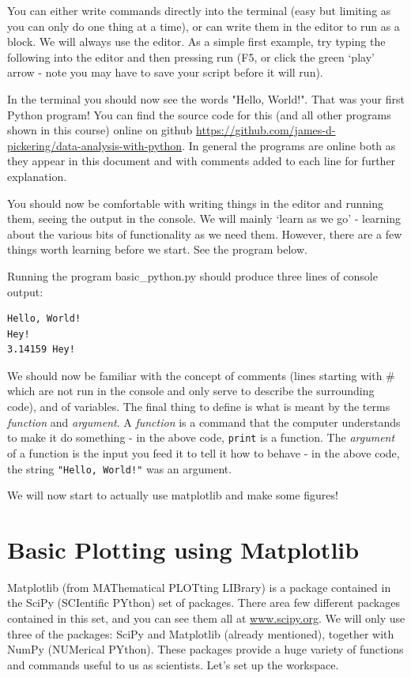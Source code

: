 \documentclass[10pt,a4paper]{memoir}
\begin{document}
You can either write commands directly into the terminal (easy but limiting as you can only do one thing at a time), or can write them in the editor to run as a block. We will always use the editor. As a simple first example, try typing the following into the editor and then pressing run (F5, or click the green `play' arrow - note you may have to save your script before it will run). 

In the terminal you should now see the words "Hello, World!". That was your first Python program! You can find the source code for this (and all other programs shown in this course) online on github \url{https://github.com/james-d-pickering/data-analysis-with-python}. In general the programs are online both as they appear in this document and with comments added to each line for further explanation.

You should now be comfortable with writing things in the editor and running them, seeing the output in the console. We will mainly `learn as we go' - learning about the various bits of functionality as we need them. However, there are a few things worth learning before we start. See the program below. 

Running the program basic\_python.py should produce three lines of console output:
\begin{lstlisting}
Hello, World!
Hey!
3.14159 Hey!
\end{lstlisting}
We should now be familiar with the concept of comments (lines starting with \# which are not run in the console and only serve to describe the surrounding code), and of variables. The final thing to define is what is meant by the terms \emph{function} and \emph{argument}. A \emph{function} is a command that the computer understands to make it do something - in the above code, \texttt{print} is a function. The \emph{argument} of a function is the input you feed it to tell it how to behave - in the above code, the string \texttt{"Hello, World!"} was an argument.  

We will now start to actually use matplotlib and make some figures!
\newpage

\section{Basic Plotting using Matplotlib}
Matplotlib (from MAThematical PLOTting LIBrary) is a package contained in the SciPy (SCIentific PYthon) set of packages. There area few different packages contained in this set, and you can see them all at \url{www.scipy.org}. We will only use three of the packages: SciPy and Matplotlib (already mentioned), together with NumPy (NUMerical PYthon). These packages provide a huge variety of functions and commands useful to us as scientists. Let's set up the workspace.
\end{document}
